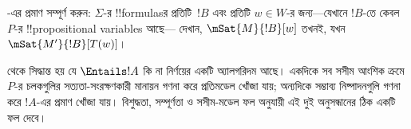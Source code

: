 \documentclass[../../../include/open-logic-section]{subfiles}
\begin{document}
\begin{prob}
  -এর প্রমাণ সম্পূর্ণ করুন:
  $\Sigma$-র !!{formula}sর প্রতিটি~$!B$ এবং প্রতিটি $w\in W$-র
  জন্য—যেখানে $!B$-তে কেবল $P$-র !!{propositional variable}s আছে—
  দেখান, $\mSat{M}{!B}[w]$ তখনই, যখন
  $\mSat{M'}{!B}[T(w)]$।
\end{prob}

 থেকে সিদ্ধান্ত হয় যে
$\Entails !A$ কি না নির্ণয়ের একটি অ্যালগরিদম আছে।
একদিকে সব সসীম আংশিক ক্রমে $P$-র চলকগুলির সত্যতা-সংরক্ষণকারী মানায়ন
গণনা করে প্রতিমডেল খোঁজা যায়; অন্যদিকে সম্ভাব্য নিষ্পাদনগুলি
গণনা করে $!A$-এর প্রমাণ খোঁজা যায়। বিশুদ্ধতা, সম্পূর্ণতা ও সসীম-মডেল
ফল অনুযায়ী এই দুই অনুসন্ধানের ঠিক একটি ফল দেবে।
\end{document}
